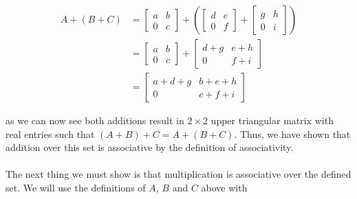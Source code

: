 \documentclass{article}
\begin{document}
        \begin{equation*}
          \begin{split}
            A+(B+C) &= 
              \begin{bmatrix}
                a & b\\
                0 & c
              \end{bmatrix} + \left( 
              \begin{bmatrix}
                d & e\\
                0 & f
              \end{bmatrix}
             + 
            \begin{bmatrix} 
              g & h\\
              0 & i
            \end{bmatrix}
            \right)\\
            &=
              \begin{bmatrix}
                a & b\\
                0 & c
              \end{bmatrix}
              +
              \begin{bmatrix}
                d+g & e+h\\
                0 & f+i
              \end{bmatrix}\\
            &=
              \begin{bmatrix}
                a+d+g & b+e+h\\
                0 & c+f+i
              \end{bmatrix}
          \end{split}
        \end{equation*}

        \noindent as we can now see both additions result in $2\times2$ upper triangular matrix with real entries such that $(A+B) +C = A+(B+C)$. Thus, we have shown that addition over this set is associative by the definition of associativity.

        \paragraph{}
        The next thing we must show is that multiplication is associative over the defined set. We will use the definitions of $A$, $B$ and $C$ above with
\end{document}

